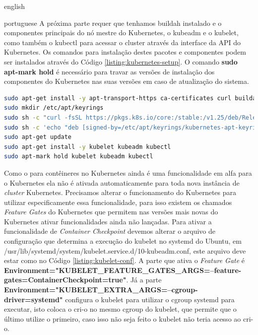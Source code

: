 \begin{otherlanguage*}{english}
\begin{otherlanguage*}{portuguese}
A próxima parte requer que tenhamos buildah instalado e o componentes principais do nó
mestre do Kubernetes, o kubeadm e o kubelet, como também o kubectl para acessar o cluster
através da interface da API do Kubernetes. Os comandos para instalação destes pacotes e
componentes podem ser instalados através do Código \ref{listing:kubernetes-setup}. O comando
\textbf{sudo apt-mark hold} é necessário para travar as versões de instalação dos componentes
do Kubernetes nas suas versões em caso de atualização do sistema.

\begin{lstlisting}[language=bash,caption={Instalação dos pacotes necessários para Kubernetes e buildah.},label={listing:kubernetes-setup}]
sudo apt-get install -y apt-transport-https ca-certificates curl buildah make
sudo mkdir /etc/apt/keyrings
sudo sh -c "curl -fsSL https://pkgs.k8s.io/core:/stable:/v1.25/deb/Release.key | gpg --dearmor -o /etc/apt/keyrings/kubernetes-apt-keyring.gpg"
sudo sh -c 'echo "deb [signed-by=/etc/apt/keyrings/kubernetes-apt-keyring.gpg] https://pkgs.k8s.io/core:/stable:/v1.25/deb/ /" | tee /etc/apt/sources.list.d/kubernetes.list'
sudo apt-get update
sudo apt-get install -y kubelet kubeadm kubectl
sudo apt-mark hold kubelet kubeadm kubectl
\end{lstlisting}

Como o  para contêineres no Kubernetes ainda é uma funcionalidade em alfa para
o Kubernetes ela não é ativada automaticamente para toda nova instância de \textit{cluster}
Kubernetes. Precisamos alterar o funcionamento do Kubernetes para utilizar especificamente essa
funcionalidade, para isso existem os chamados \textit{Feature Gates} do Kubernetes que permitem
nas versões mais novas do Kubernetes ativar funcionalidades ainda não lançadas. Para ativar a
funcionalidade de \textit{Container Checkpoint} devemos alterar o arquivo de configuração que
determina a execução do kubelet no systemd do Ubuntu, em
/usr/lib/systemd/system/kubelet.service.d/10-kubeadm.conf, este arquivo deve estar como no
Código \ref{listing:kubelet-conf}. A parte que ativa o \textit{Feature Gate} é
\textbf{Environment="KUBELET\_FEATURE\_GATES\_ARGS=--feature-gates=ContainerCheckpoint=true"}. Já
a parte \textbf{Environment="KUBELET\_EXTRA\_ARGS=--cgroup-driver=systemd"} configura o kubelet
para utilizar o cgroup systemd para executar, isto coloca o cri-o no mesmo cgroup do kubelet, 
que permite que o último utilize o primeiro, caso isso não seja feito o kubelet não teria acesso
ao cri-o.


\end{otherlanguage*}
\end{otherlanguage*}
